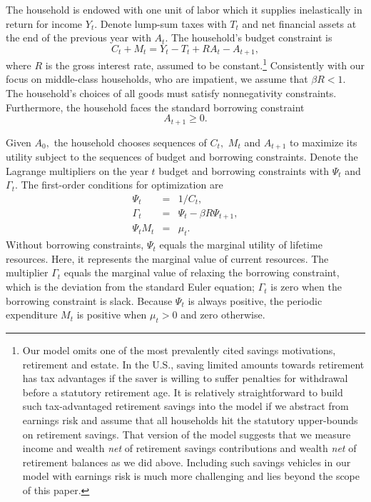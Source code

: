 \documentclass[fleqccn,12pt]{article}
\begin{document}
The household is endowed with one unit of labor which it supplies inelastically in return for income $Y_{t}.$ Denote lump-sum taxes with $T_{t}$ and net financial assets at the end of the previous year with $A_{t}.$ The household's budget constraint is
\begin{equation}
C_{t}+M_{t}=Y_{t}-T_{t}+RA_{t}-A_{t+1},\label{basic_budget constraint}
\end{equation}
where $R$ is the gross interest rate, assumed to be constant.\footnote{\label{retirementSavings}Our model omits one of the most prevalently cited savings motivations, retirement and estate. In the U.S., saving limited amounts towards retirement has tax advantages if the saver is willing to suffer penalties for withdrawal before a statutory retirement age. It is relatively straightforward to build such tax-advantaged retirement savings into the model if we abstract from earnings risk and assume that all households hit the statutory upper-bounds on retirement savings. That version of the model suggests that we measure income and wealth \emph{net} of retirement savings contributions and wealth \emph{net} of retirement balances as we did above. Including such savings vehicles in our model with earnings risk is much more challenging and lies beyond the scope of this paper.} Consistently with our focus on middle-class households, who are impatient, we assume that $\beta R<1$. The household's choices of all goods must satisfy nonnegativity constraints. Furthermore, the household faces the standard borrowing constraint
\begin{equation}
A_{t+1}\geq0.\label{basic_borrowing constraint}
\end{equation}

Given $A_{0},$ the household chooses sequences of $C_{t},$ $M_{t}$ and $A_{t+1}$ to maximize its utility subject to the sequences of budget and borrowing constraints. Denote the Lagrange multipliers on the year $t$ budget and borrowing constraints with $\Psi_{t}$ and $\Gamma_{t}$. The first-order conditions for optimization are
\begin{eqnarray}
\Psi_{t} & = & 1/C_{t},\label{basic_foc on C}\\
\Gamma_{t}& = & \Psi_{t}-\beta R\Psi_{t+1},\label{basic_foc on A}\\
\Psi_{t}M_{t}& = & \mu_{t}.\label{basic_foc on M}
\end{eqnarray}
\noindent Without borrowing constraints, $\Psi_{t}$ equals the marginal utility of lifetime resources. Here, it represents the marginal value of current resources. The multiplier $\Gamma_{t}$ equals the marginal value of relaxing the borrowing constraint, which is the deviation from the standard Euler equation; $\Gamma_{t}$ is zero when the borrowing constraint is slack. Because $\Psi_{t}$ is always positive, the periodic expenditure $M_{t}$ is positive when $\mu_{t}>0$ and zero otherwise.
\end{document}
